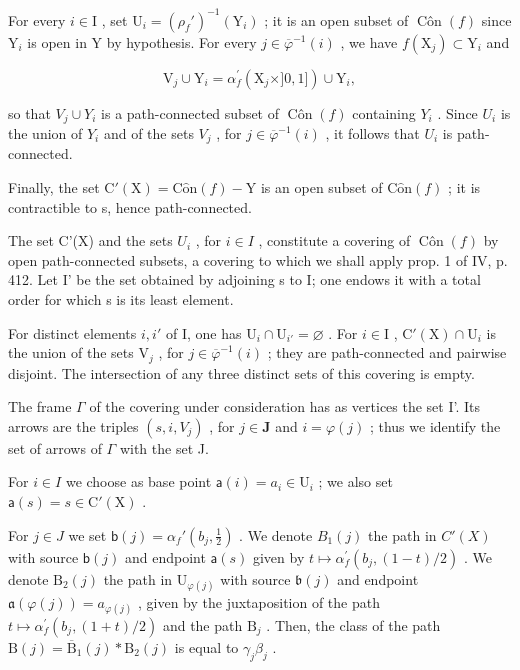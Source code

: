 For every \(i \in \mathrm{I}\) , set \(\mathrm{U}_i = (\rho_f')^{-1}(\mathrm{Y}_i)\) ; it is an open subset of \(\operatorname{Côn}(f)\) since \(\mathrm{Y}_i\) is open in \(\mathrm{Y}\) by hypothesis. For every \(j \in \overline{\varphi}^{-1}(i)\) , we have \(f(\mathrm{X}_j) \subset \mathrm{Y}_i\) and

\[
\mathrm{V} _ {j} \cup \mathrm{Y} _ {i} = \alpha_ {f} ^ {\prime} (\mathrm{X} _ {j} \times ] 0, 1 ]) \cup \mathrm{Y} _ {i},
\]

so that \(V_{j} \cup Y_{i}\) is a path-connected subset of \(\operatorname{Côn}(f)\) containing \(Y_{i}\) . Since \(U_{i}\) is the union of \(Y_{i}\) and of the sets \(V_{j}\) , for \(j \in \overline{\varphi}^{-1}(i)\) , it follows that \(U_{i}\) is path-connected.

Finally, the set \(\mathrm{C}'(\mathrm{X}) = \mathrm{C}\hat{\mathrm{o}}\mathrm{n}(f) - \mathrm{Y}\) is an open subset of \(\mathrm{C}\hat{\mathrm{o}}\mathrm{n}(f)\) ; it is contractible to s, hence path-connected.

The set C'(X) and the sets \(U_{i}\) , for \(i \in I\) , constitute a covering of \(\operatorname{Côn}(f)\) by open path-connected subsets, a covering to which we shall apply prop. 1 of IV, p. 412. Let I' be the set obtained by adjoining s to I; one endows it with a total order for which s is its least element.

For distinct elements \(i, i'\) of I, one has \(\mathrm{U}_{i} \cap \mathrm{U}_{i'} = \varnothing\) . For \(i \in \mathrm{I}\) , \(\mathrm{C}'(\mathrm{X}) \cap \mathrm{U}_{i}\) is the union of the sets \(\mathrm{V}_{j}\) , for \(j \in \overline{\varphi}^{-1}(i)\) ; they are path-connected and pairwise disjoint. The intersection of any three distinct sets of this covering is empty.

The frame \(\Gamma\) of the covering under consideration has as vertices the set I'. Its arrows are the triples \((s, i, V_j)\) , for \(j \in \mathbf{J}\) and \(i = \varphi(j)\) ; thus we identify the set of arrows of \(\Gamma\) with the set J.

For \(i \in I\) we choose as base point \(\mathsf{a}(i) = a_i \in \mathrm{U}_i\) ; we also set \(\mathsf{a}(s) = s \in \mathrm{C}'(\mathrm{X})\) .

For \(j \in J\) we set \(\mathsf{b}(j) = \alpha_f'(b_j, \frac{1}{2})\) . We denote \(B_1(j)\) the path in \(C'(X)\) with source \(\mathsf{b}(j)\) and endpoint \(\mathsf{a}(s)\) given by \(t \mapsto \alpha_{f}^{\prime}(b_{j}, (1 - t)/2)\) . We denote \(\mathrm{B}_{2}(j)\) the path in \(\mathrm{U}_{\varphi(j)}\) with source \(\mathfrak{b}(j)\) and endpoint \(\mathfrak{a}(\varphi(j)) = a_{\varphi(j)}\) , given by the juxtaposition of the path \(t \mapsto \alpha_{f}^{\prime}(b_{j}, (1 + t)/2)\) and the path \(\mathrm{B}_{j}\) . Then, the class of the path \(\mathrm{B}(j) = \overline{\mathrm{B}}_{1}(j) * \mathrm{B}_{2}(j)\) is equal to \(\gamma_{j}\beta_{j}\) .

